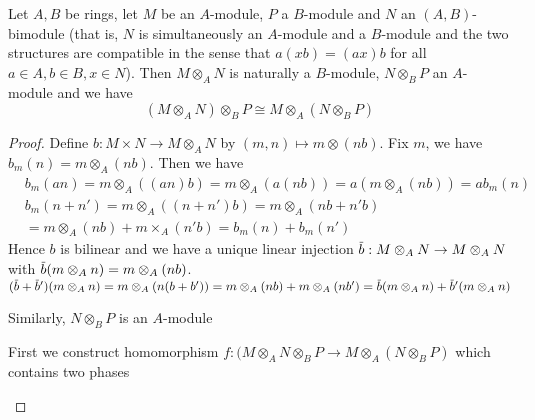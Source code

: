 \documentclass[11pt]{article}
\begin{document}
\begin{exercise}
\label{2.15}
Let \(A,B\) be rings, let \(M\) be an \(A\)-module, \(P\) a \(B\)-module and \(N\)
an \((A,B)\)-bimodule (that is, \(N\) is simultaneously an \(A\)-module and a \(B\)-module and
the two structures are compatible in the sense that \(a(xb)=(ax)b\) for all \(a\in A,b\in B,x\in N\)).
Then \(M\otimes_AN\) is naturally a \(B\)-module, \(N\otimes_BP\) an \(A\)-module and we have
\begin{equation*}
(M\otimes_AN)\otimes_BP\cong M\otimes_A(N\otimes_BP)
\end{equation*}
\end{exercise}

\begin{proof}
Define \(b:M\times N\to M\otimes_AN\) by \((m,n)\mapsto m\otimes(nb)\). Fix \(m\), we
have \(b_m(n)=m\otimes_A(nb)\). Then we have
\begin{align*}
&b_m(an)=m\otimes_A((an)b)=m\otimes_A(a(nb))=a(m\otimes_A(nb))=ab_m(n)\\
&b_m(n+n')=m\otimes_A((n+n')b)=m\otimes_A(nb+n'b)\\&=m\otimes_A(nb)+m\times_A(n'b)=b_m(n)+b_m(n')
\end{align*}
Hence \(b\) is bilinear and we have a unique linear injection \(\barb:M\otimes_AN\to M\otimes_AN\)
with
\(\barb(m\otimes_An)=m\otimes_A(nb)\).
\((\barb+\barb')(m\otimes_A n)=m\otimes_A(n(b+b'))=m\otimes_A(nb)+m\otimes_A(nb')=\barb(m\otimes_An)+\barb'(m\otimes_An)\)

Similarly, \(N\otimes_BP\) is an \(A\)-module

First we construct homomorphism \(f:(M\otimes_AN\otimes_BP\to M\otimes_A(N\otimes_BP)\) which contains two phases
\begin{center}\quad{}
\end{center}


\end{proof}
\end{document}
